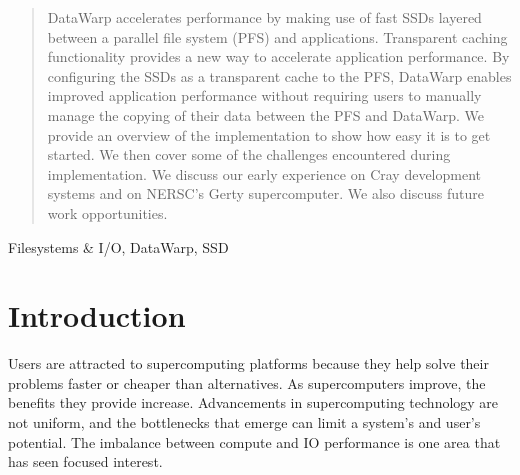 \documentclass[10pt, conference, compsocconf]{IEEEtran}
\begin{document}




\maketitle

\begin{abstract}
DataWarp accelerates performance by making use of fast SSDs layered between a parallel file system (PFS) and applications. Transparent caching functionality provides a new way to accelerate application performance. By configuring the SSDs as a transparent cache to the PFS, DataWarp enables improved application performance without requiring users to manually manage the copying of their data between the PFS and DataWarp. We provide an overview of the implementation to show how easy it is to get started. We then cover some of the challenges encountered during implementation.  We discuss our early experience on Cray development systems and on NERSC's Gerty supercomputer.  We also discuss future work opportunities.
\end{abstract}

\begin{IEEEkeywords}
Filesystems \& I/O, DataWarp, SSD
\end{IEEEkeywords}



%
\IEEEpeerreviewmaketitle



\section{Introduction}

Users are attracted to supercomputing platforms because they help solve their problems faster or cheaper than alternatives.  As supercomputers improve, the benefits they provide increase.  Advancements in supercomputing technology are not uniform, and the bottlenecks that emerge can limit a system's and user's potential.  The imbalance between compute and IO performance is one area that has seen focused interest.
\end{document}
